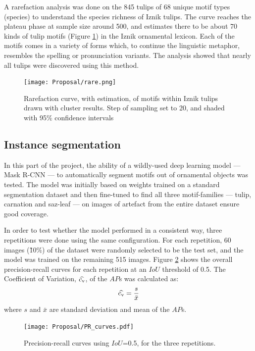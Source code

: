 \documentclass[11pt]{article}
\begin{document}
A rarefaction analysis was done on the 845 tulips of 68 unique motif types (species) to understand the species richness of Iznik tulips. The curve reaches the plateau phase at sample size around 500, and estimates there to be about 70 kinds of tulip motifs (Figure \ref{fig:rare}) in the Iznik ornamental lexicon. Each of the motifs comes in a variety of forms which, to continue the linguistic metaphor, resembles the spelling or pronunciation variants. The analysis showed that nearly all tulips were discovered using this method.   
\begin{figure}[H]
\centering
\texttt{[image: Proposal/rare.png]}
\caption{Rarefaction curve, with estimation, of motifs within Iznik tulips drawn with cluster results. Step of sampling set to 20, and shaded with 95\% confidence intervals}
\label{fig:rare}
\end{figure}
\subsection{Instance segmentation}
In this part of the project, the ability of a wildly-used deep learning model --- Mask R-CNN --- to automatically segment motifs out of ornamental objects was tested. The model was initially based on weights trained on a standard segmentation dataset and then fine-tuned to find all three motif-families --- tulip, carnation and saz-leaf --- on images of artefact from the entire dataset ensure good coverage. \par
In order to test whether the model performed in a consistent way, three repetitions were done using the same configuration. For each repetition, 60 images (\~10\%) of the dataset were randomly selected to be the test set, and the model was trained on the remaining 515 images. Figure \ref{fig:eval} shows the overall precision-recall curves for each repetition at an $IoU$ threshold of 0.5. The Coefficient of Variation, ${\widehat {c_{\rm {v}}}}$, of the $AP$s was calculated as:
\begin{equation}
{\widehat {c_{\rm {v}}}}={\frac {s}{\bar {x}}}
\end{equation}
where $s$ and $\bar{x}$ are standard deviation and mean of the $AP$s.\par
\begin{figure}[H]
\centering
\texttt{[image: Proposal/PR\_curves.pdf]}
\caption{Precision-recall curves using $IoU$=0.5, for the three repetitions.}
\label{fig:eval}
\end{figure}
\end{document}
